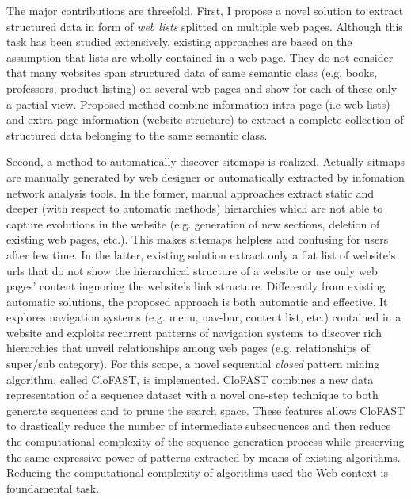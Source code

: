 

The major contributions are threefold. First, I propose a novel solution to extract structured data in form of \emph{web lists} splitted on multiple web pages. Although this task has been studied extensively, existing approaches are based on the assumption that lists are wholly contained in a web page. They do not consider that many websites span structured data of same semantic class (e.g. books, professors, product listing)  on several web pages and show for each of these only a partial view. Proposed method combine information intra-page (i.e web lists) and extra-page information (website structure) to extract a complete collection of structured data belonging to the same semantic class.

Second, a method to automatically discover sitemaps is realized. Actually  sitmaps are manually generated by web designer or automatically extracted by infomation network analysis tools. In the former, manual approaches extract static and deeper (with respect to automatic methods) hierarchies which are not able to capture evolutions in the website (e.g. generation of new sections, deletion of existing web pages, etc.). This makes sitemaps helpless and confusing for users after few time. In the latter, existing solution extract only a flat list of website's urls that do not show the hierarchical structure of a website or use only web pages' content ingnoring the website's link structure. Differently from existing automatic solutions, the proposed approach  is both automatic and effective. It explores navigation systems (e.g. menu, nav-bar, content list, etc.) contained in a website and exploits recurrent patterns of navigation systems to discover rich hierarchies that unveil relationships among web pages (e.g. relationships of super/sub category). For this scope, a novel sequential \emph{closed} pattern mining algorithm, called CloFAST, is implemented. CloFAST combines a new data representation of a sequence dataset  with a novel one-step technique to both generate sequences and to prune the search space. These features allows CloFAST to drastically reduce the number of
intermediate subsequences and then reduce the computational complexity of the sequence generation process while preserving the same
expressive power of patterns extracted by means of existing algorithms. Reducing the computational complexity of algorithms used the Web context is foundamental task.

